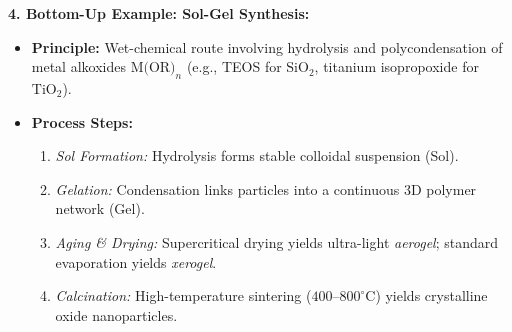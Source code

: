 \begin{theorysol}
\textbf{4. Bottom-Up Example: Sol-Gel Synthesis:}
\begin{itemize}
\item \textbf{Principle:} Wet-chemical route involving hydrolysis and polycondensation of metal alkoxides $\text{M(OR)}_n$ (e.g., TEOS for $\text{SiO}_2$, titanium isopropoxide for $\text{TiO}_2$).
\item \textbf{Process Steps:}
  \begin{enumerate}
  \item \textit{Sol Formation:} Hydrolysis forms stable colloidal suspension (Sol).
  \item \textit{Gelation:} Condensation links particles into a continuous 3D polymer network (Gel).
  \item \textit{Aging \& Drying:} Supercritical drying yields ultra-light \textit{aerogel}; standard evaporation yields \textit{xerogel}.
  \item \textit{Calcination:} High-temperature sintering ($400\text{--}800^\circ\text{C}$) yields crystalline oxide nanoparticles.
  \end{enumerate}
\end{itemize}
\end{theorysol}
\vspace{4mm}

